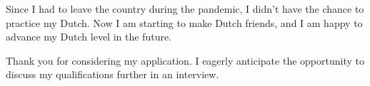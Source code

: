 \documentclass[11pt, a4paper]{awesome-cv}
\begin{document}
\begin{cvletter}
Since I had to leave the country during the pandemic, I didn't have the chance to practice my Dutch. Now I am starting to make Dutch friends, and I am happy to advance my Dutch level in the future.

Thank you for considering my application. I eagerly anticipate the opportunity to discuss my qualifications further in an interview.


\end{cvletter}


\makeletterclosing
\end{document}
